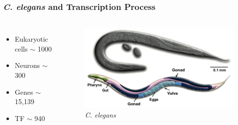 \documentclass{beamer}
\begin{document}

\begin{frame}
\frametitle{\textit{C. elegans} and Transcription Process}
\begin{columns}[c] %


\begin{itemize}
\item {Eukaryotic cells \color{green}$ \sim $ 1000} 
\item {Neurons \color{green} $ \sim $ 300} 
\item {Genes \color{red} $ \sim $ 15,139}
\item {TF \color{red} $ \sim $ 940}
\end{itemize}

\begin{figure}
\centering
	\includegraphics[scale=.2]{diagrams/celegans_image2.jpg}
	\caption{\textit{C. elegans}}
	\label{fig:cElegans}
\end{figure}


\end{columns}
\end{frame}
\end{document}
